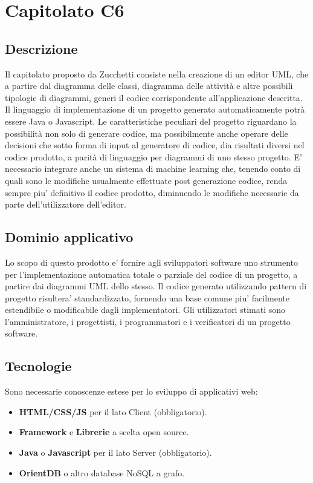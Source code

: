 \newpage
\section{Capitolato C6}

\subsection{Descrizione}

Il capitolato proposto da Zucchetti consiste nella creazione di un
editor UML, che a partire dal diagramma delle classi, diagramma delle attività e altre possibili tipologie di diagrammi, generi il codice corrispondente all'applicazione descritta. Il linguaggio di implementazione di un progetto generato automaticamente potrà essere Java o Javascript. Le caratteristiche peculiari del progetto riguardano la possibilità non solo di generare codice, ma possibilmente anche operare delle decisioni che sotto forma di input al generatore di codice, dia risultati diversi nel codice prodotto,
a parità di linguaggio per diagrammi di uno stesso progetto. E' necessario
integrare anche un sistema di machine learning che, tenendo conto
di quali sono le modifiche usualmente effettuate post generazione
codice, renda sempre piu' definitivo il codice prodotto, diminuendo le modifiche necessarie da parte dell'utilizzatore dell'editor.

\subsection{Dominio applicativo}

Lo scopo di questo prodotto e' fornire agli sviluppatori software
uno strumento per l'implementazione automatica totale o parziale del
codice di un progetto, a partire dai diagrammi UML dello stesso. Il
codice generato utilizzando pattern di progetto risultera' standardizzato,
fornendo una base comune piu' facilmente estendibile o modificabile
dagli implementatori. Gli utilizzatori stimati sono l'amministratore,
i progettisti, i programmatori e i verificatori di un progetto software.

\subsection{Tecnologie}

Sono necessarie conoscenze estese per lo sviluppo di applicativi web:
\begin{itemize}
	\item \textbf{HTML/CSS/JS} per il lato Client
	(obbligatorio).
	\item \textbf{Framework }e \textbf{Librerie} a scelta open source.
	\item \textbf{Java }o\textbf{ Javascript} per il lato Server
	(obbligatorio).
	\item \textbf{OrientDB} o altro database NoSQL a grafo.
\end{itemize}

